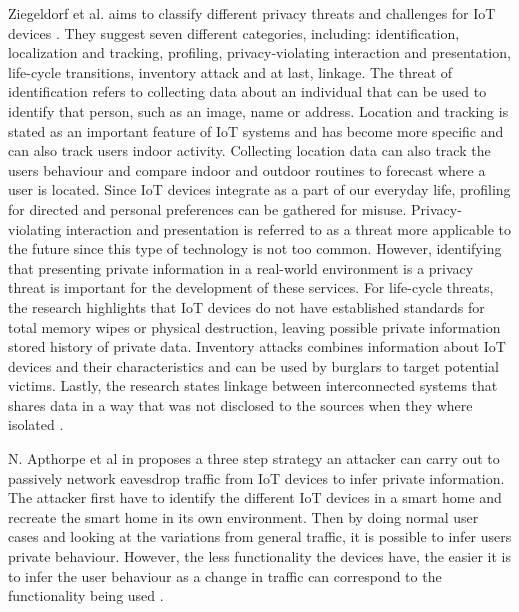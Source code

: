 Ziegeldorf et al. aims to classify different privacy threats and challenges for \gls{IoT} devices \cite{IoTPrivacyAndMisuse}. They suggest seven different categories, including: identification, localization and tracking, profiling, privacy-violating interaction and presentation, life-cycle transitions, inventory attack and at last, linkage. The threat of identification refers to collecting data about an individual that can be used to identify that person, such as an image, name or address. Location and tracking is stated as an important feature of \gls{IoT} systems and has become more specific and can also track users indoor activity. Collecting location data can also track the users behaviour and compare indoor and outdoor routines to forecast where a user is located. Since \gls{IoT} devices integrate as a part of our everyday life, profiling for directed and personal preferences can be gathered for misuse. Privacy-violating interaction and presentation is referred to as a threat more applicable to the future since this type of technology is not too common. However, identifying that presenting private information in a real-world environment is a privacy threat is important for the development of these services. For life-cycle threats, the research highlights that \gls{IoT} devices do not have established standards for total memory wipes or physical destruction, leaving possible private information stored history of private data. Inventory attacks combines information about \gls{IoT} devices and their characteristics and can be used by burglars to target potential victims. Lastly, the research states linkage between interconnected systems that shares data in a way that was not disclosed to the sources when they where isolated \cite{IoTPrivacyAndMisuse}. 

N. Apthorpe et al in \cite{VulEncIoTTraffic} proposes a three step strategy an attacker can carry out to passively network eavesdrop traffic from \gls{IoT} devices to infer private information. The attacker first have to identify the different \gls{IoT} devices in a smart home and recreate the smart home in its own environment. Then by doing normal user cases and looking at the variations from general traffic, it is possible to infer users private behaviour. However, the less functionality the devices have, the easier it is to infer the user behaviour as a change in traffic can correspond to the functionality being used \cite{VulEncIoTTraffic}. 

